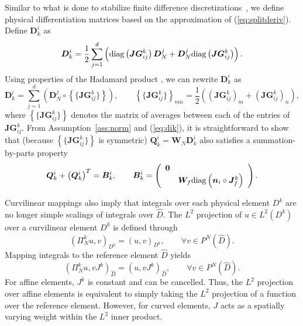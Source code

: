 \documentclass[preprint,10pt]{article}
\theoremstyle{definition}
\theoremstyle{lemma}
\theoremstyle{theorem}
\theoremstyle{assumption}
\renewcommand{\hat}{\widehat}
\newcommand{\LRp}[1]{\left( #1 \right)}
\newcommand{\LRc}[1]{\left\{ #1 \right\}}
\newcommand{\avg}[1] {\ensuremath{\LRc{\!\{#1\}\!}}}
\newcommand{\diag}[1]{{\rm diag}\LRp{#1}}
\begin{document}
{Similar to what is done to stabilize finite difference discretizations~\cite{nordstrom2006cfdf, gassner2016split}, we define physical differentiation matrices based on the approximation of (\ref{eq:splitderiv}).  Define $\bm{D}^i_k$ as
\[
  \bm{D}^i_k = \frac12 \sum_{j=1}^d \left(\diag{\bm{JG}^k_{ij}}\bm{D}^j_N + \bm{D}^j_N\diag{\bm{JG}^k_{ij}}\right).
\]
Using properties of the Hadamard product \cite{horn2012matrix}, we can rewrite $\bm{D}^i_k$ as 
\begin{equation}
\bm{D}^i_k = \sum_{j=1}^d \LRp{\bm{D}^j_N \circ \avg{\bm{JG}^k_{ij}}}, \qquad \avg{\bm{JG}^k_{ij}}_{mn} = \frac{1}{2}\LRp{\LRp{\bm{JG}^k_{ij}}_m + \LRp{\bm{JG}^k_{ij}}_n},
\label{eq:dik}
\end{equation}
where $\avg{\bm{JG}^k_{ij}}$ denotes the matrix of averages between each of the entries of $\bm{JG}^k_{ij}$.  From Assumption~\ref{ass:norm} and (\ref{eq:dik}), it is straightforward to show that (because $\avg{\bm{JG}^k_{ij}}$ is symmetric) $\bm{Q}^i_k = \bm{W}_N\bm{D}^i_k$ also satisfies a summation-by-parts property
\begin{equation}
\bm{Q}^i_k + \LRp{\bm{Q}^i_k}^T = \bm{B}^i_k, \qquad \bm{B}^i_k = 
\LRp{\begin{array}{cc}
\bm{0}&\\
& \bm{W}_f \diag{\bm{n}_i\circ\bm{J}^k_f}
\end{array}}.
\label{eq:sbpk}
\end{equation}

Curvilinear mappings also imply that integrals over each physical element $D^k$ are no longer simple scalings of integrals over $\hat{D}$.  The $L^2$ projection of $u\in L^2\LRp{D^k}$ over a curvilinear element $D^k$ is defined through 
\begin{equation}
\LRp{\Pi^k_N u,v}_{D^k} = \LRp{u,v}_{D^k}, \qquad \forall v\in P^N\LRp{\hat{D}}.
\label{eq:l2curv}
\end{equation}
Mapping integrals to the reference element $\hat{D}$ yields
\begin{equation}
\LRp{\Pi^k_N u,v J^k}_{\hat{D}} = \LRp{u,vJ^k}_{\hat{D}}, \qquad \forall v\in P^N\LRp{\hat{D}}.
\label{eq:l2curvmap}
\end{equation}
For affine elements, $J^k$ is constant and can be cancelled.  Thus, the $L^2$ projection over affine elements is equivalent to simply taking the $L^2$ projection of a function over the reference element.  However, for curved elements, $J$ acts as a spatially varying weight within the $L^2$ inner product.  

}
\end{document}
